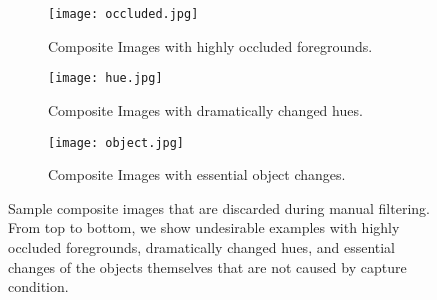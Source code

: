 \documentclass[10pt,twocolumn,letterpaper]{article}
\begin{document}
\begin{figure*}[hb]
	\centering
	\begin{subfigure}[t]{7in}
		\centering
		\texttt{[image: occluded.jpg]}
		\vspace{-5pt}
		\caption{Composite Images with highly occluded foregrounds.}\label{Fig:occluded}
	\end{subfigure}
\begin{subfigure}[t]{7in}
		\centering
		\texttt{[image: hue.jpg]}
		\vspace{-5pt}
		\caption{Composite Images with dramatically changed hues.}\label{Fig:hue}
	\end{subfigure}
\begin{subfigure}[t]{7in}
		\centering
		\texttt{[image: object.jpg]}
		\vspace{-5pt}
		\caption{Composite Images with essential object changes.}\label{Fig:object}
	\end{subfigure}

	\caption{Sample composite images that are discarded during manual filtering. From top to bottom, we show undesirable examples with highly occluded foregrounds, dramatically changed hues, and essential changes of the objects themselves that are not caused by capture condition.}
	\label{fig:badsample}
\end{figure*}

\newcommand{\tabincell}[2]{\begin{tabular}{@{}#1@{}}#2\end{tabular}}
\end{document}
